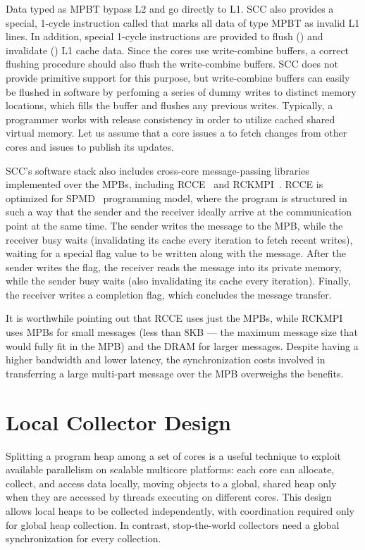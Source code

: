 Data typed as MPBT bypass L2 and go directly to L1. SCC also provides a
special, 1-cycle instruction called  that marks all data of type
MPBT as invalid L1 lines. In addition, special 1-cycle instructions are
provided to flush () and invalidate () L1 cache data.
Since the cores use write-combine buffers, a correct flushing procedure should
also flush the write-combine buffers. SCC does not provide primitive support
for this purpose, but write-combine buffers can easily be flushed in software
by perfoming a series of dummy writes to distinct memory locations, which fills
the buffer and flushes any previous writes. Typically, a programmer works with
release consistency in order to utilize cached shared virtual memory. Let us
assume that a core issues a  to fetch changes from other cores
and issues  to publish its updates.

SCC's software stack also includes cross-core message-passing libraries
implemented over the MPBs, including RCCE~\cite{Mattson2010} and
RCKMPI~\cite{Urena2011}. RCCE is optimized for SPMD~\cite{} programming model,
where the program is structured in such a way that the sender and the receiver
ideally arrive at the communication point at the same time. The sender writes
the message to the MPB, while the receiver busy waits (invalidating its cache
every iteration to fetch recent writes), waiting for a special flag value to be
written along with the message. After the sender writes the flag, the receiver
reads the message into its private memory, while the sender busy waits (also
invalidating its cache every iteration). Finally, the receiver writes a
completion flag, which concludes the message transfer.

It is worthwhile pointing out that RCCE uses just the MPBs, while RCKMPI uses
MPBs for small messages (less than 8KB --- the maximum message size that would
fully fit in the MPB) and the DRAM for larger messages. Despite having a higher
bandwidth and lower latency, the synchronization costs involved in transferring
a large multi-part message over the MPB overweighs the benefits.

\section{Local Collector Design}

Splitting a program heap among a set of cores is a useful technique to exploit
available parallelism on scalable multicore platforms: each core can allocate,
collect, and access data locally, moving objects to a global, shared heap only
when they are accessed by threads executing on different cores. This design
allows local heaps to be collected independently, with coordination required
only for global heap collection. In contrast, stop-the-world collectors need a
global synchronization for every collection.


